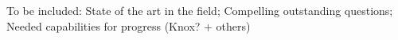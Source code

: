 \documentclass[PICOReport.tex]{subfiles}
\begin{document}
To be included: State of the art in the field; Compelling outstanding questions; Needed capabilities for progress (Knox? + others)
\end{document}
